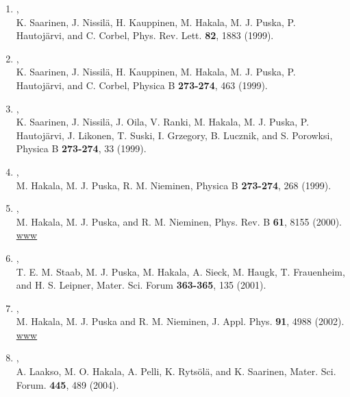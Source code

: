 \documentclass[12pt,a4]{report}
\begin{document}
\begin{enumerate}
\item {}, \\K. Saarinen, J. Nissil\"a, H. Kauppinen, M. Hakala,
M. J. Puska, P. Hautoj\"arvi, and C. Corbel, Phys. Rev. Lett. {\bf
82}, 1883 (1999).

\item {},\\ K. Saarinen, J. Nissil\"a, H. Kauppinen, M. Hakala,
M. J. Puska, P. Hautoj\"arvi, and C. Corbel,  Physica B {\bf
273-274}, 463 (1999). 

\item {},\\K. Saarinen, J. Nissil\"a, J. Oila, V. Ranki, M. Hakala,
M. J. Puska, P. Hautoj\"arvi, J. Likonen, T. Suski, I. Grzegory,
B. Lucznik, and S. Porowksi, Physica B
{\bf 273-274}, 33 (1999). 

\item {},\\ M. Hakala, M. J. Puska, R. M. Nieminen, Physica B {\bf
273-274}, 268 (1999).

\item {},\\ M. Hakala, M. J. Puska, and R. M. Nieminen, Phys. Rev. B
{\bf 61}, 8155 (2000).
\href{http://journals.aps.org/prb/abstract/10.1103/PhysRevB.61.8155}{www}

\item {},\\ T. E. M. Staab,
M. J. Puska, M. Hakala, A. Sieck, M. Haugk, T. Frauenheim, and
H. S. Leipner, Mater. Sci. Forum {\bf 363-365}, 135 (2001).

\item{},\\ M. Hakala,
M. J. Puska and R. M. Nieminen, J. Appl. Phys. {\bf 91}, 4988 (2002).
\href{http://aip.scitation.org/doi/abs/10.1063/1.1462844}{www}

\item{},\\
A. Laakso, M. O. Hakala, A. Pelli, K. Ryts\"ol\"a, and K. Saarinen,
Mater. Sci. Forum. {\bf 445}, 489 (2004).


\end{enumerate}
\end{document}
